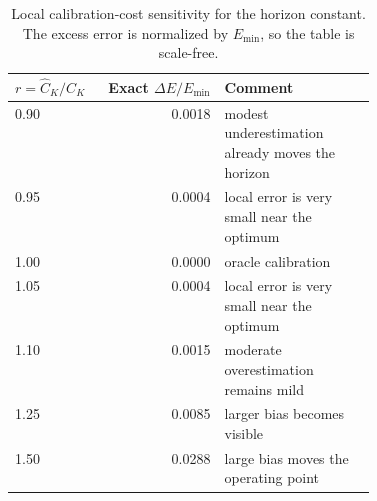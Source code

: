 \begin{table}[!htbp]
\centering
\small
\caption{Local calibration-cost sensitivity for the horizon constant. The excess error is normalized by $E_{\min}$, so the table is scale-free.}
\label{tab:calibration_cost}
\begin{tabular}{lrp{0.42\linewidth}}
\toprule
$r = \widehat C_K/C_K$ & Exact $\Delta E/E_{\min}$ & Comment \\
\midrule
0.90 & 0.0018 & modest underestimation already moves the horizon \\
0.95 & 0.0004 & local error is very small near the optimum \\
1.00 & 0.0000 & oracle calibration \\
1.05 & 0.0004 & local error is very small near the optimum \\
1.10 & 0.0015 & moderate overestimation remains mild \\
1.25 & 0.0085 & larger bias becomes visible \\
1.50 & 0.0288 & large bias moves the operating point \\
\bottomrule
\end{tabular}
\end{table}
